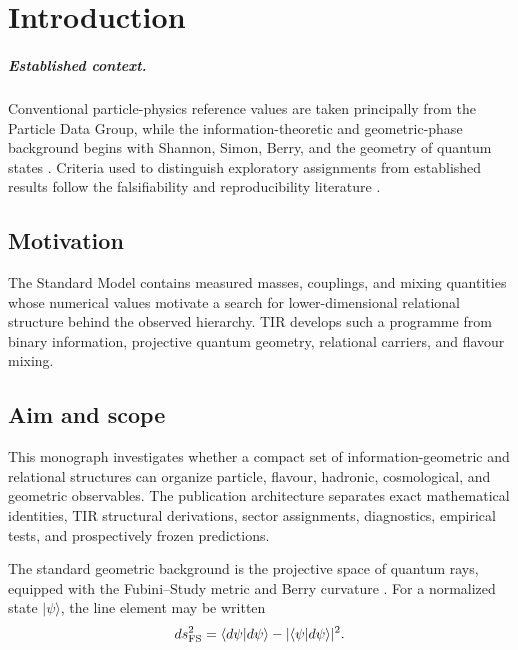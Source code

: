 \chapter{Introduction}
\label{ch:introduction}

\paragraph{Established context.}
Conventional particle-physics reference values are taken principally from the
Particle Data Group, while the information-theoretic and geometric-phase
background begins with Shannon, Simon, Berry, and the geometry of quantum states
\cite{PDG2024,shannon1948,Simon1983,berry1984,ProvostVallee1980}. Criteria used
to distinguish exploratory assignments from established results follow the
falsifiability and reproducibility literature \cite{Popper1959,Munafo2017}.

\section{Motivation}
The Standard Model contains measured masses, couplings, and mixing quantities
whose numerical values motivate a search for lower-dimensional relational
structure behind the observed hierarchy. TIR develops such a programme from
binary information, projective quantum geometry, relational carriers, and
flavour mixing.

\section{Aim and scope}
This monograph investigates whether a compact set of information-geometric and
relational structures can organize particle, flavour, hadronic, cosmological,
and geometric observables. The publication architecture separates exact
mathematical identities, TIR structural derivations, sector assignments,
diagnostics, empirical tests, and prospectively frozen predictions.

The standard geometric background is the projective space of quantum rays,
equipped with the Fubini--Study metric and Berry curvature
\cite{ProvostVallee1980,Simon1983,berry1984}. For a normalized state
$|\psi\rangle$, the line element may be written
\begin{equation}
  ds_{\rm FS}^2=\langle d\psi|d\psi\rangle
  -|\langle\psi|d\psi\rangle|^2.
  \label{eq:fubini_study}
\end{equation}

